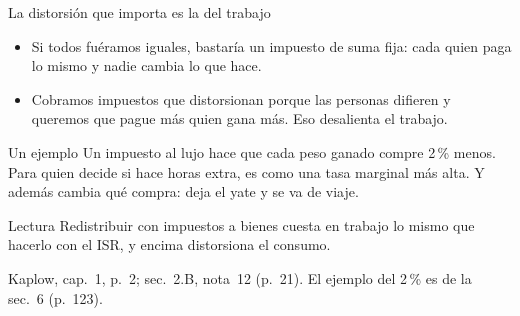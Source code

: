 \documentclass[aspectratio=169,11pt]{beamer}
\newcommand{\fuente}[1]{\par\vfill{\small\color{cGris}#1\par}}
\begin{document}
\begin{frame}{La distorsión que importa es la del trabajo}
  \begin{itemize}
    \item Si todos fuéramos iguales, bastaría un impuesto de suma fija: cada quien paga lo mismo y nadie cambia lo que hace.
    \item Cobramos impuestos que distorsionan porque las personas difieren y queremos que pague más quien gana más. Eso desalienta el trabajo.
  \end{itemize}
  \pause
  \begin{block}{Un ejemplo}
    Un impuesto al lujo hace que cada peso ganado compre 2\,\% menos. Para quien decide si hace horas extra, es como una tasa marginal más alta. Y además cambia qué compra: deja el yate y se va de viaje.
  \end{block}
  \pause
  \begin{block}{Lectura}
    Redistribuir con impuestos a bienes cuesta en trabajo lo mismo que hacerlo con el ISR, y encima distorsiona el consumo.
  \end{block}
  \fuente{Kaplow, cap.~1, p.~2; sec.~2.B, nota~12 (p.~21). El ejemplo del 2\,\% es de la sec.~6 (p.~123).}
\end{frame}
\end{document}
